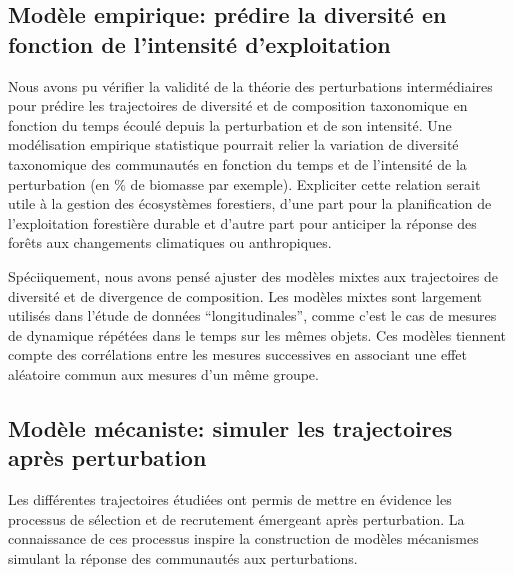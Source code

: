 \documentclass[
  11pt,
  french,
  A4paper,
  extrafontsizes,onecolumn,openright
  ]{memoir}
\begin{document}
\subsection{Modèle empirique: prédire la diversité en fonction de
l'intensité
d'exploitation}\label{modele-empirique-predire-la-diversite-en-fonction-de-lintensite-dexploitation}

Nous avons pu vérifier la validité de la théorie des perturbations
intermédiaires pour prédire les trajectoires de diversité et de
composition taxonomique en fonction du temps écoulé depuis la
perturbation et de son intensité. Une modélisation empirique statistique
pourrait relier la variation de diversité taxonomique des communautés en
fonction du temps et de l'intensité de la perturbation (en \% de
biomasse par exemple). Expliciter cette relation serait utile à la
gestion des écosystèmes forestiers, d'une part pour la planification de
l'exploitation forestière durable et d'autre part pour anticiper la
réponse des forêts aux changements climatiques ou anthropiques.

Spéciiquement, nous avons pensé ajuster des modèles mixtes aux
trajectoires de diversité et de divergence de composition. Les modèles
mixtes sont largement utilisés dans l'étude de données
``longitudinales'', comme c'est le cas de mesures de dynamique répétées
dans le temps sur les mêmes objets. Ces modèles tiennent compte des
corrélations entre les mesures successives en associant une effet
aléatoire commun aux mesures d'un même groupe.

\subsection{Modèle mécaniste: simuler les trajectoires après
perturbation}\label{modele-mecaniste-simuler-les-trajectoires-apres-perturbation}

Les différentes trajectoires étudiées ont permis de mettre en évidence
les processus de sélection et de recrutement émergeant après
perturbation. La connaissance de ces processus inspire la construction
de modèles mécanismes simulant la réponse des communautés aux
perturbations.
\end{document}
